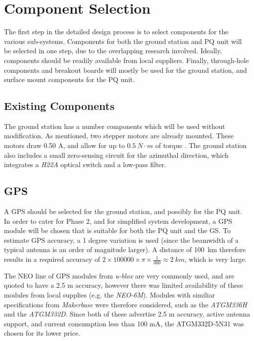 \graphicspath{{./figures}}

\section{Component Selection}
The first step in the detailed design process is to select components for the various sub-systems. Components for both the ground station and PQ unit will be selected in one step, due to the overlapping research involved. Ideally, components should be readily available from local suppliers. Finally, through-hole components and breakout boards will mostly be used for the ground station, and surface mount components for the PQ unit.

\subsection{Existing Components}
The ground station has a number components which will be used without modification. As mentioned, two stepper motors are already mounted. These motors draw 0.50 A, and allow for up to $\SI{0.5}{N \cdot m}$ of torque \cite{datasheet-4118}. The ground station also includes a small zero-sensing circuit for the azimuthal direction, which integrates a \textit{H22A} optical switch \cite{datasheet-H22A1} and a low-pass filter.

\subsection{GPS}\label{sec:components_gps}
A GPS should be selected for the ground station, and possibly for the PQ unit. In order to cater for Phase 2, and for simplified system development, a GPS module will be chosen that is suitable for both the PQ unit and the GS. To estimate GPS accuracy, a 1 degree variation is used (since the beamwidth of a typical antenna is an order of magnitude larger). A distance of \SI{100}{km} therefore results in a required accuracy of $2 \times 100 000 \times \pi \times \frac{1}{360} \approx \SI{2}{km}$, which is very large.

The NEO line of GPS modules from \textit{u-blox} are very commonly used, and are quoted to have a 2.5 m accuracy, however there was limited availability of these modules from local supplies (e.g. the \textit{NEO-6M}). Modules with similiar specifications from \textit{Makerbase} were therefore considered, such as the \textit{ATGM336H} and the \textit{ATGM332D}. Since both of these advertise 2.5 m accuracy, active antenna support, and current consumption less than 100 mA, the ATGM332D-5N31 was chosen for its lower price.

